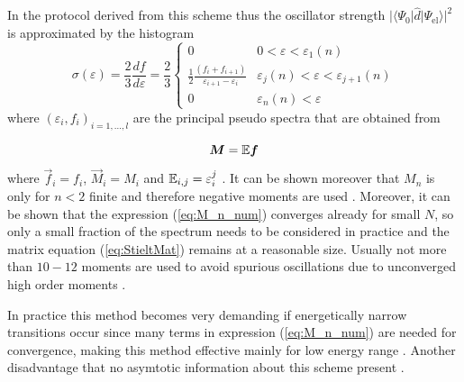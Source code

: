 In the protocol derived from this scheme thus the oscillator strength $|\langle \Psi_0|\hat{d}|\Psi_\text{el}\rangle|^2$ is approximated by the histogram
\begin{equation}
\sigma(\varepsilon)=\frac 23 \frac{df}{d\varepsilon}
      =\frac 23 \begin{cases} 0 & 0< \varepsilon <\varepsilon_1(n) \\
      \frac 12 \frac{(f_i+f_{i+1})}{\varepsilon_{i+1}-\varepsilon_i}  & \varepsilon_j(n)<\varepsilon<\varepsilon_{j+1}(n)\\
      0   & \varepsilon_n(n)<\varepsilon \end{cases}
\end{equation}
where $(\varepsilon_i,f_i)_{i=1,...,l}$ are the principal pseudo spectra \cite{stieltjeLanczos} that are obtained from

\begin{equation} \label{eq:StieltMat}
   \bm{M}=\mathbb{E}\bm{f}
\end{equation}
where $\vec{f}_i=f_i$, $\vec{M}_i=M_i$ and $\mathbb{E}_{i,j}=\varepsilon_i^j$ \cite{langhoff3}.
It can be shown moreover that $M_n$ is only for $n<2$ finite and therefore negative moments are used \cite{stieltjesCeder}.
Moreover, it can be shown that the expression (\ref{eq:M_n_num}) converges already for small $N$, so only a small fraction of the spectrum needs to be considered in practice and the matrix equation (\ref{eq:StieltMat}) remains at a reasonable size. 
Usually not more than $10-12$ moments are used to avoid spurious oscillations due to unconverged high order moments \cite{stieltje}.

In practice this method becomes very demanding if energetically narrow transitions occur since many terms in expression (\ref{eq:M_n_num}) are needed for convergence, making this method effective mainly for low energy range \cite{H2pDeCleva}.
Another disadvantage that no asymtotic information about this scheme present \cite{H2pDeCleva}.

